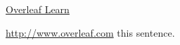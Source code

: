 ﻿\href{https://www.overleaf.com/learn}
\href{https://www.overleaf.com/learn}{Overleaf Learn} %

\url{http://www.overleaf.com}
\hypertarget{thesentence}{this sentence}.
